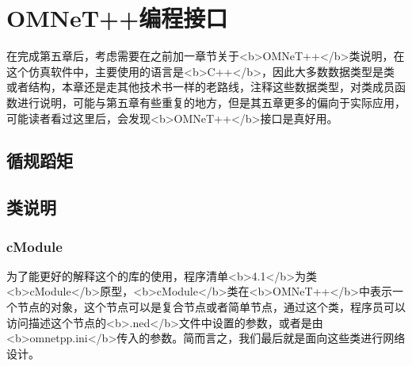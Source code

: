 \chapter{OMNeT++编程接口}

\begin{summary}
在完成第五章后，考虑需要在之前加一章节关于<b>OMNeT++</b>类说明，在这个仿真软件中，主要使用的语言是<b>C++</b>，因此大多数数据类型是类或者结构，本章还是走其他技术书一样的老路线，注释这些数据类型，对类成员函数进行说明，可能与第五章有些重复的地方，但是其五章更多的偏向于实际应用，可能读者看过这里后，会发现<b>OMNeT++</b>接口是真好用。\\
\end{summary}

\section{循规蹈矩}


\section{类说明}



\subsection{cModule}
为了能更好的解释这个的库的使用，程序清单<b>4.1</b>为类<b>cModule</b>原型，<b>cModule</b>类在<b>OMNeT++</b>中表示一个节点的对象，这个节点可以是复合节点或者简单节点，通过这个类，程序员可以访问描述这个节点的<b>.ned</b>文件中设置的参数，或者是由<b>omnetpp.ini</b>传入的参数。简而言之，我们最后就是面向这些类进行网络设计。

